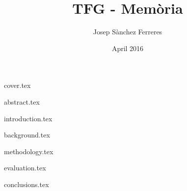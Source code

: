 \documentclass[10pt,a4paper]{report}
\title{TFG - Memòria}
\author{Josep Sànchez Ferreres}
\date{April 2016}
\begin{document}
\cite{gurobi}

\maketitle

\tableofcontents

{cover.tex}

{abstract.tex}

{introduction.tex}

{background.tex}

{methodology.tex}

{evaluation.tex}

{conclusions.tex}

\printbibliography[heading=bibliography]{}
\end{document}
